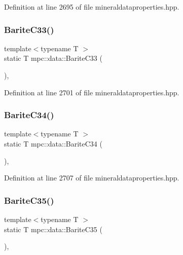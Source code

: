 Definition at line 2695 of file mineraldataproperties.\+hpp.

\mbox{\label{namespacempc_1_1data_a1335f0638b10f0a8a160bce037a79338}} 
\subsubsection{\texorpdfstring{Barite\+C33()}{BariteC33()}}
{\footnotesize\ttfamily template$<$typename T $>$ \\
static T mpc\+::data\+::\+Barite\+C33 (\begin{DoxyParamCaption}{ }\end{DoxyParamCaption})\hspace{0.3cm}{\ttfamily [inline]}, {\ttfamily [static]}}



Definition at line 2701 of file mineraldataproperties.\+hpp.

\mbox{\label{namespacempc_1_1data_a2f2f303d1d98e3d7a9569ef790f89186}} 
\subsubsection{\texorpdfstring{Barite\+C34()}{BariteC34()}}
{\footnotesize\ttfamily template$<$typename T $>$ \\
static T mpc\+::data\+::\+Barite\+C34 (\begin{DoxyParamCaption}{ }\end{DoxyParamCaption})\hspace{0.3cm}{\ttfamily [inline]}, {\ttfamily [static]}}



Definition at line 2707 of file mineraldataproperties.\+hpp.

\mbox{\label{namespacempc_1_1data_ae3a53ebe8f2fea3665ab8076eda9221a}} 
\subsubsection{\texorpdfstring{Barite\+C35()}{BariteC35()}}
{\footnotesize\ttfamily template$<$typename T $>$ \\
static T mpc\+::data\+::\+Barite\+C35 (\begin{DoxyParamCaption}{ }\end{DoxyParamCaption})\hspace{0.3cm}{\ttfamily [inline]}, {\ttfamily [static]}}



